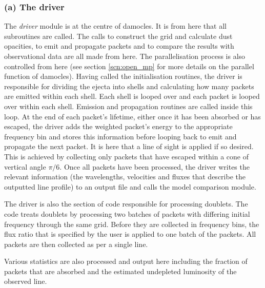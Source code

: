         \subsubsection{(a) The driver}
        The \textit{driver} module is at the centre of {\sc damocles}.  It is from here that all subroutines are called.  The calls to construct the grid and calculate dust opacities, to emit and propagate packets and to compare the results with observational data are all made from here.  The parallelisation process is also controlled from here (see section \ref{scn:open_mp} for more details on the parallel function of {\sc damocles}).  Having called the initialisation routines, the driver is responsible for dividing the ejecta into shells and calculating how many packets are emitted within each shell.  Each shell is looped over and each packet is looped over within each shell. Emission and propagation routines are called inside this loop.  At the end of each packet's lifetime, either once it has been absorbed or has escaped, the driver adds the weighted packet's energy to the appropriate frequency bin and stores this information before looping back to emit and propagate the next packet.  It is here that a line of sight is applied if so desired.  This is achieved by collecting only packets that have escaped within a cone of vertical angle $\pi/6$.  Once all packets have been processed, the driver writes the relevant information (the wavelengths, velocities and fluxes that describe the outputted line profile) to an output file and calls the model comparison module.  
        
        The driver is also the section of code responsible for processing doublets.  The code treats doublets by processing two batches of packets with differing initial frequency through the same grid.  Before they are collected in frequency bins, the flux ratio that is specified by the user is applied to one batch of the packets.  All packets are then collected as per a single line. 
        
        Various statistics are also processed and output here including the fraction of packets that are absorbed and the estimated undepleted luminosity of the observed line. 
        

